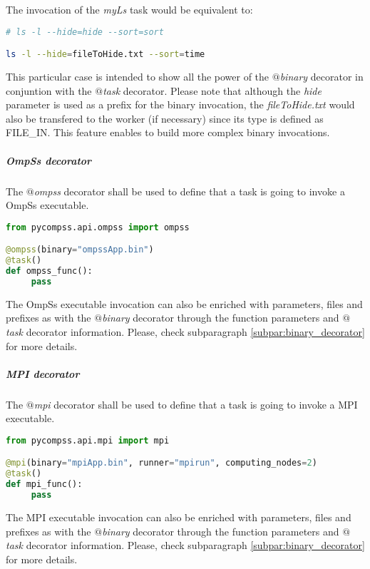 The invocation of the {\it myLs} task would be equivalent to:

\begin{lstlisting}[language=bash]
# ls -l --hide=hide --sort=sort

ls -l --hide=fileToHide.txt --sort=time
\end{lstlisting}

This particular case is intended to show all the power of the {\it $@$binary} decorator in conjuntion with the
{\it $@$task} decorator. Please note that although the {\it hide} parameter is used as a prefix for the binary invocation,
the {\it fileToHide.txt} would also be transfered to the worker (if necessary) since its type is defined as FILE\_IN. 
This feature enables to build more complex binary invocations.

\subparagraph{OmpSs decorator}
\label{subpar:ompss_decorator}

The {\it $@$ompss} decorator shall be used to define that a task is going to invoke a OmpSs executable.

\vspace{1.0cm}

\begin{lstlisting}[language=python]
from pycompss.api.ompss import ompss

@ompss(binary="ompssApp.bin")
@task()
def ompss_func():
     pass
\end{lstlisting}

The OmpSs executable invocation can also be enriched with parameters, files and prefixes as with the 
{\it $@$binary} decorator through the function parameters and {\it $@$task} decorator information.
Please, check subparagraph \ref{subpar:binary_decorator} for more details.

\vspace{-0.2cm}

\subparagraph{MPI decorator}
\label{subpar:mpi_decorator}

The {\it $@$mpi} decorator shall be used to define that a task is going to invoke a MPI executable.

\begin{lstlisting}[language=python]
from pycompss.api.mpi import mpi

@mpi(binary="mpiApp.bin", runner="mpirun", computing_nodes=2)
@task()
def mpi_func():
     pass
\end{lstlisting}

The MPI executable invocation can also be enriched with parameters, files and prefixes as with the 
{\it $@$binary} decorator through the function parameters and {\it $@$task} decorator information.
Please, check subparagraph \ref{subpar:binary_decorator} for more details.


